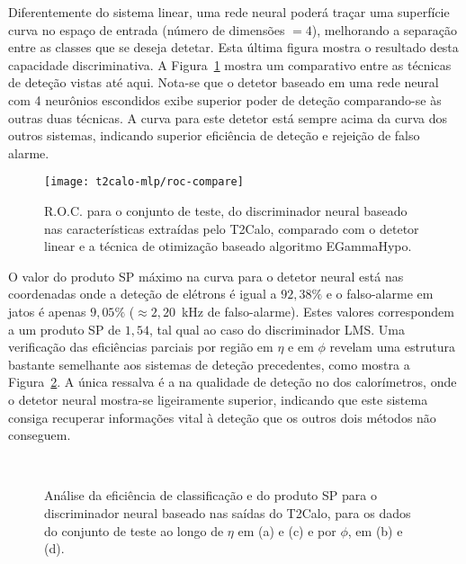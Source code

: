 Diferentemente do sistema linear, uma rede neural poderá traçar uma superfície
curva no espaço de entrada (número de dimensões $=4$), melhorando a separação
entre as classes que se deseja detetar. Esta última figura mostra o resultado
desta capacidade discriminativa. A Figura~\ref{fig:best-t2calo-test-roc}
mostra um comparativo entre as técnicas de deteção vistas até aqui. Nota-se
que o detetor baseado em uma rede neural com 4 neurônios escondidos exibe
superior poder de deteção comparando-se às outras duas técnicas. A curva para
este detetor está sempre acima da curva dos outros sistemas, indicando
superior eficiência de deteção e rejeição de falso alarme.

\begin{figure}
\begin{center}
\texttt{[image: t2calo-mlp/roc-compare]}
\end{center}
\caption{R.O.C. para o conjunto de teste, do discriminador neural baseado nas
características extraídas pelo T2Calo, comparado com o detetor linear e a
técnica de otimização baseado algoritmo EGammaHypo.}
\label{fig:best-t2calo-test-roc}
\end{figure}

O valor do produto SP máximo na curva para o detetor neural está nas
coordenadas onde a deteção de elétrons é igual a $92,38\%$ e o falso-alarme em
jatos é apenas $9,05\%$ ($\approx 2,20$~kHz de falso-alarme). Estes valores
correspondem a um produto SP de $1,54$, tal qual ao caso do discriminador
LMS. Uma verificação das eficiências parciais por região em $\eta$ e em $\phi$
revelam uma estrutura bastante semelhante aos sistemas de deteção precedentes,
como mostra a Figura~\ref{fig:best-t2calo-eta-phi}. A única ressalva é a na
qualidade de deteção no  dos calorímetros, onde o detetor neural
mostra-se ligeiramente superior, indicando que este sistema consiga recuperar
informações vital à deteção que os outros dois métodos não conseguem.

\begin{figure}
\begin{center}
\mbox{%
}
\mbox{%
}
\end{center}
\caption{Análise da eficiência de classificação e do produto SP para o
discriminador neural baseado nas saídas do T2Calo, para os dados do conjunto
de teste ao longo de $\eta$ em (a) e (c) e por $\phi$, em (b) e (d).}
\label{fig:best-t2calo-eta-phi}
\end{figure}

